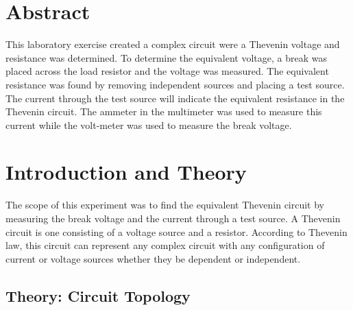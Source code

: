\documentclass[11pt]{article}
\begin{document}
\section*{Abstract}
\normalsize

This laboratory exercise created a complex circuit were a Thevenin voltage and resistance was determined. To determine the equivalent voltage, a break was placed across the load resistor and the voltage was measured. The equivalent resistance was found by removing independent sources and placing a test source. The current through the test source will indicate the equivalent resistance in the Thevenin circuit. The ammeter in the multimeter was used to measure this current while the volt-meter was used to measure the break voltage.

\section {Introduction and Theory}


The scope of this experiment was to find the equivalent Thevenin circuit by measuring the break voltage and the current through a test source. A Thevenin circuit is one consisting of a voltage source and a resistor. According to Thevenin law, this circuit can represent any complex circuit with any configuration of current or voltage sources whether they be dependent or independent.

\subsection{Theory: Circuit Topology}
\end{document}
